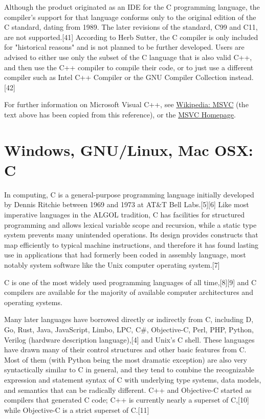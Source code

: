 \vpara
Although the product originated as an IDE for the C programming language, the compiler's support for that language conforms only to the original edition of the C standard, dating from 1989. The later revisions of the standard, C99 and C11, are not supported.[41] According to Herb Sutter, the C compiler is only included for "historical reasons" and is not planned to be further developed. Users are advised to either use only the subset of the C language that is also valid C++, and then use the C++ compiler to compile their code, or to just use a different compiler such as Intel C++ Compiler or the GNU Compiler Collection instead.[42]

\vpara
For further information on Microsoft Visual C++, see \href{http://en.wikipedia.org/wiki/Visual_C\%2B\%2B}{Wikipedia: MSVC} (the text above has been copied from this reference), or the  \href{http://msdn.microsoft.com/en-us/vstudio/hh386302}{MSVC Homepage}.

\newpage
\section{Windows, GNU/Linux, Mac OSX: C}
In computing, C is a general-purpose programming language initially developed by Dennis Ritchie between 1969 and 1973 at AT\&T Bell Labs.[5][6] Like most imperative languages in the ALGOL tradition, C has facilities for structured programming and allows lexical variable scope and recursion, while a static type system prevents many unintended operations. Its design provides constructs that map efficiently to typical machine instructions, and therefore it has found lasting use in applications that had formerly been coded in assembly language, most notably system software like the Unix computer operating system.[7]

\vpara
C is one of the most widely used programming languages of all time,[8][9] and C compilers are available for the majority of available computer architectures and operating systems.

\vpara
Many later languages have borrowed directly or indirectly from C, including D, Go, Rust, Java, JavaScript, Limbo, LPC, C\#, Objective-C, Perl, PHP, Python, Verilog (hardware description language),[4] and Unix's C shell. These languages have drawn many of their control structures and other basic features from C. Most of them (with Python being the most dramatic exception) are also very syntactically similar to C in general, and they tend to combine the recognizable expression and statement syntax of C with underlying type systems, data models, and semantics that can be radically different. C++ and Objective-C started as compilers that generated C code; C++ is currently nearly a superset of C,[10] while Objective-C is a strict superset of C.[11]

